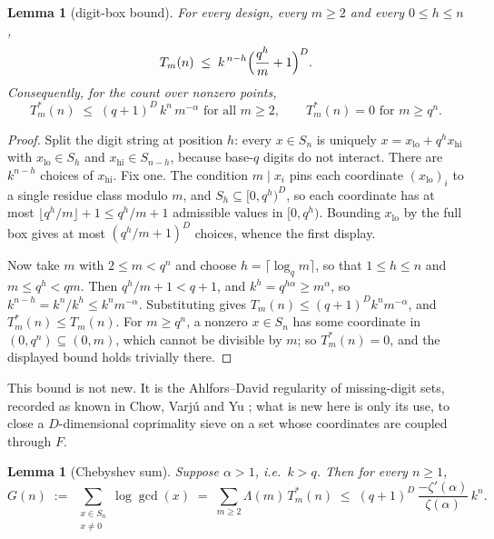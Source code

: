 \documentclass[11pt]{amsart}
\newtheorem{lemma}[theorem]{Lemma}
\theoremstyle{definition}
\theoremstyle{remark}
\begin{document}
\begin{lemma}[digit-box bound]
\label{lem:box}
For every design, every $m \ge 2$ and every $0 \le h \le n$,
\[
  T_m(n) \;\le\; k^{\,n-h}\Bigl(\frac{q^{h}}{m}+1\Bigr)^{D}.
\]
Consequently, for the count over nonzero points,
\[
  T^{*}_m(n) \;\le\; (q+1)^{D}\,k^{n}\,m^{-\alpha} \text{ for all } m \ge 2,
  \qquad T^{*}_m(n) = 0 \text{ for } m \ge q^{n}.
\]
\end{lemma}

\begin{proof}
Split the digit string at position $h$: every $x \in S_n$ is uniquely $x = x_{\mathrm{lo}} + q^{h}x_{\mathrm{hi}}$ with $x_{\mathrm{lo}} \in S_h$ and $x_{\mathrm{hi}} \in S_{n-h}$, because base-$q$ digits do not interact. There are $k^{n-h}$ choices of $x_{\mathrm{hi}}$. Fix one. The condition $m \mid x_i$ pins each coordinate $(x_{\mathrm{lo}})_i$ to a single residue class modulo $m$, and $S_h \subseteq [0,q^{h})^{D}$, so each coordinate has at most $\lfloor q^{h}/m\rfloor + 1 \le q^{h}/m + 1$ admissible values in $[0,q^{h})$. Bounding $x_{\mathrm{lo}}$ by the full box gives at most $(q^{h}/m+1)^{D}$ choices, whence the first display.

Now take $m$ with $2 \le m < q^{n}$ and choose $h = \lceil \log_q m\rceil$, so that $1 \le h \le n$ and $m \le q^{h} < qm$. Then $q^{h}/m + 1 < q + 1$, and $k^{h} = q^{h\alpha} \ge m^{\alpha}$, so $k^{n-h} = k^{n}/k^{h} \le k^{n}m^{-\alpha}$. Substituting gives $T_m(n) \le (q+1)^{D}k^{n}m^{-\alpha}$, and $T^{*}_m(n) \le T_m(n)$. For $m \ge q^{n}$, a nonzero $x \in S_n$ has some coordinate in $(0,q^{n}) \subseteq (0,m)$, which cannot be divisible by $m$; so $T^{*}_m(n) = 0$, and the displayed bound holds trivially there.
\end{proof}

This bound is not new. It is the Ahlfors--David regularity of missing-digit sets, recorded as known in Chow, Varj\'u and Yu \cite[\S1]{cvy}; what is new here is only its use, to close a $D$-dimensional coprimality sieve on a set whose coordinates are coupled through $F$.

\begin{lemma}[Chebyshev sum]
\label{lem:cheb}
Suppose $\alpha > 1$, i.e.\ $k > q$. Then for every $n \ge 1$,
\[
  G(n) \;:=\; \sum_{\substack{x \in S_n \\ x \ne 0}} \log \gcd(x)
  \;=\; \sum_{m \ge 2} \Lambda(m)\,T^{*}_m(n)
  \;\le\; (q+1)^{D}\,\frac{-\zeta'(\alpha)}{\zeta(\alpha)}\,k^{n} .
\]
\end{lemma}
\end{document}
